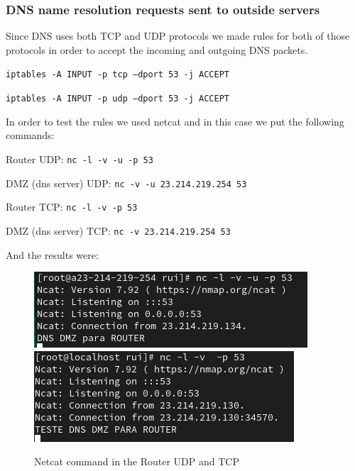 \documentclass{article}
\begin{document}
\subsubsection{DNS name resolution requests sent to outside servers}
\texttt{}\par
Since DNS uses both TCP and UDP protocols we made rules for both of those protocols in order to accept the incoming and outgoing DNS packets.\par
\texttt{}\par
\texttt{iptables -A INPUT -p tcp --dport 53 -j ACCEPT}\par
\texttt{iptables -A INPUT -p udp --dport 53 -j ACCEPT}\par
\texttt{}\par
In order to test the rules we used netcat and in this case we put the following commands:\par
\texttt{}\par
Router UDP: \texttt{nc -l -v -u -p 53} \par
DMZ (dns server) UDP: \texttt{nc -v -u 23.214.219.254 53} \par
\texttt{}\par
\texttt{}\par
Router TCP: \texttt{nc -l -v -p 53} \par
DMZ (dns server) TCP: \texttt{nc -v 23.214.219.254 53} \par
\texttt{}\par
And the results were:
\begin{figure}[H]
    \centering
    \includegraphics[scale=0.5]{in/in_dns_router.png}
    \includegraphics[scale=0.5]{in/in_dns_router_tcp.png}
    \caption{Netcat command in the Router UDP and TCP}
    \label{fig:network-arc}
\end{figure}
\end{document}
